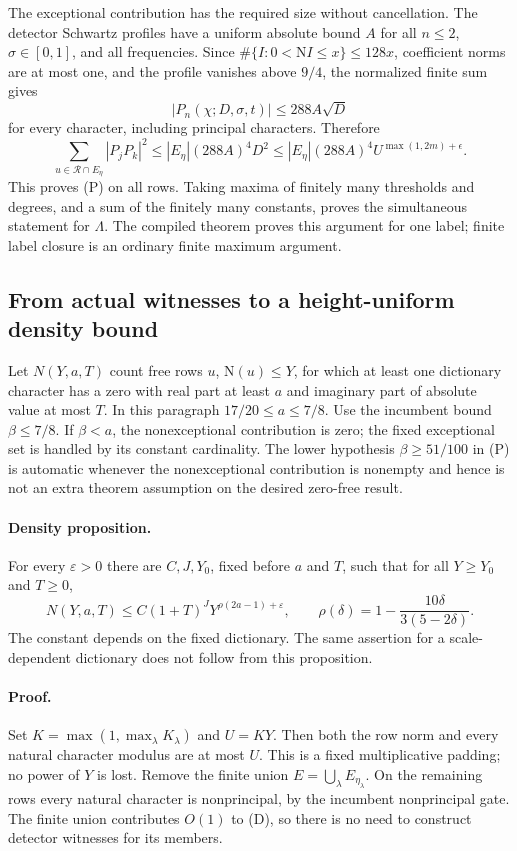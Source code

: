 The exceptional contribution has the required size without cancellation.
The detector Schwartz profiles have a uniform absolute bound $A$ for all
$n\le2$, $\sigma\in[0,1]$, and all frequencies. Since
$\#\{I:0<\mathrm NI\le x\}\le128x$, coefficient norms are at most one,
and the profile vanishes above $9/4$, the normalized finite sum gives
\[
 |P_n(\chi;D,\sigma,t)|\le288A\sqrt D
\]
for every character, including principal characters. Therefore
\[
 \sum_{u\in\mathcal R\cap E_\eta}|P_jP_k|^2
 \le |E_\eta|(288A)^4D^2
 \le |E_\eta|(288A)^4U^{\max(1,2m)+\epsilon}.
\]
This proves (P) on all rows. Taking maxima of finitely many thresholds and
degrees, and a sum of the finitely many constants, proves the simultaneous
statement for $\Lambda$. The compiled theorem
 proves this argument for one label; finite
label closure is an ordinary finite maximum argument.

\subsection{From actual witnesses to a height-uniform density bound}

Let $N(Y,a,T)$ count free rows $u$, $\mathrm N(u)\le Y$, for which at least
one dictionary character has a zero with real part at least $a$ and
imaginary part of absolute value at most $T$. In this paragraph
$17/20\le a\le7/8$. Use the incumbent bound $\beta\le7/8$. If $\beta<a$, the
nonexceptional contribution is zero; the fixed exceptional set is handled
by its constant cardinality. The lower hypothesis $\beta\ge51/100$
in (P) is automatic whenever the nonexceptional contribution is nonempty
and hence is not an extra theorem assumption on the desired zero-free result.

\paragraph{Density proposition.}
For every $\varepsilon>0$ there are $C,J,Y_0$, fixed before $a$ and $T$,
such that for all $Y\ge Y_0$ and $T\ge0$,
\[
 N(Y,a,T)\le C(1+T)^JY^{\rho(2a-1)+\varepsilon},
 \qquad
 \rho(\delta)=1-\frac{10\delta}{3(5-2\delta)}.
 \tag{D}
\]
The constant depends on the fixed dictionary. The same assertion for a
scale-dependent dictionary does not follow from this proposition.

\paragraph{Proof.}
Set $K=\max(1,\max_\lambda K_\lambda)$ and $U=KY$. Then both the row norm
and every natural character modulus are at most $U$. This is a fixed
multiplicative padding; no power of $Y$ is lost. Remove the finite union
$E=\bigcup_\lambda E_{\eta_\lambda}$. On the remaining rows every natural
character is nonprincipal, by the incumbent nonprincipal gate. The finite
union contributes $O(1)$ to (D), so there is no need to construct detector
witnesses for its members.

